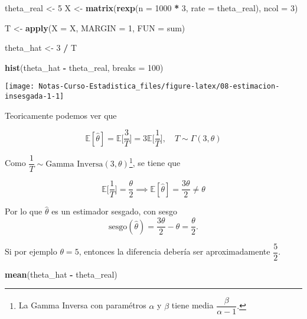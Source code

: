 \documentclass[
  12pt,
]{book}
\newenvironment{Shaded}{\begin{snugshade}}{\end{snugshade}}
\newcommand{\DataTypeTok}[1]{\textcolor[rgb]{0.13,0.29,0.53}{#1}}
\newcommand{\DecValTok}[1]{\textcolor[rgb]{0.00,0.00,0.81}{#1}}
\newcommand{\KeywordTok}[1]{\textcolor[rgb]{0.13,0.29,0.53}{\textbf{#1}}}
\newcommand{\NormalTok}[1]{#1}
\newcommand{\OperatorTok}[1]{\textcolor[rgb]{0.81,0.36,0.00}{\textbf{#1}}}
\newcommand{\StringTok}[1]{\textcolor[rgb]{0.31,0.60,0.02}{#1}}
\begin{document}
\begin{Shaded}
\begin{Highlighting}[]
\NormalTok{theta\_real \textless{}{-}}\StringTok{ }\DecValTok{5}
\NormalTok{X \textless{}{-}}\StringTok{ }\KeywordTok{matrix}\NormalTok{(}\KeywordTok{rexp}\NormalTok{(}\DataTypeTok{n =} \DecValTok{1000} \OperatorTok{*}\StringTok{ }\DecValTok{3}\NormalTok{, }\DataTypeTok{rate =}\NormalTok{ theta\_real), }\DataTypeTok{ncol =} \DecValTok{3}\NormalTok{)}

\NormalTok{T \textless{}{-}}\StringTok{ }\KeywordTok{apply}\NormalTok{(}\DataTypeTok{X =}\NormalTok{ X, }\DataTypeTok{MARGIN =} \DecValTok{1}\NormalTok{, }\DataTypeTok{FUN =}\NormalTok{ sum)}

\NormalTok{theta\_hat \textless{}{-}}\StringTok{ }\DecValTok{3} \OperatorTok{/}\StringTok{ }\NormalTok{T}

\KeywordTok{hist}\NormalTok{(theta\_hat }\OperatorTok{{-}}\StringTok{ }\NormalTok{theta\_real, }\DataTypeTok{breaks =} \DecValTok{100}\NormalTok{)}
\end{Highlighting}
\end{Shaded}

\begin{center}\texttt{[image: Notas-Curso-Estadistica\_files/figure-latex/08-estimacion-insesgada-1-1]} \end{center}

Teoricamente podemos ver que

\[\mathbb E[\hat\theta] = \mathbb E\bigg[\dfrac 3T\bigg]= 3\mathbb E\bigg[\dfrac
1T\bigg], \quad T\sim \Gamma(3,\theta)\]

Como \(\dfrac 1T \sim \text{Gamma Inversa}(3,\theta)\)\footnote{La Gamma Inversa con paramétros \(\alpha\) y \(\beta\) tiene media \(\dfrac{\beta}{\alpha-1}.\)}, se tiene que

\[\mathbb E\bigg[\dfrac 1T\bigg] = \dfrac{\theta}2 \implies \mathbb E[\hat
\theta] =\dfrac{3\theta}2 \neq \theta\]

Por lo que \(\hat \theta\) es un estimador sesgado, con sesgo
\[\text{sesgo}(\hat\theta) = \dfrac{3\theta}{2} -\theta = \dfrac \theta 2.\]

Si por ejemplo \(\theta=5\), entonces la diferencia debería ser aproximadamente
\(\dfrac 5 2\).

\begin{Shaded}
\begin{Highlighting}[]
\KeywordTok{mean}\NormalTok{(theta\_hat }\OperatorTok{{-}}\StringTok{ }\NormalTok{theta\_real)}
\end{Highlighting}
\end{Shaded}
\end{document}
